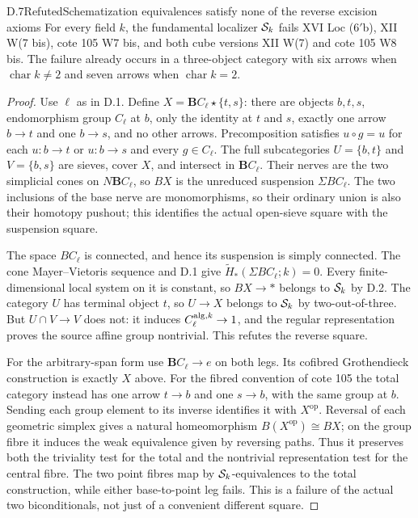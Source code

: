 \begin{claim}{D.7}{Refuted}{Schematization equivalences satisfy none of the reverse excision axioms}
\label{D7}
For every field $k$, the fundamental localizer $\mathcal S_k$ fails XVI
Loc (6$'$b), XII W(7 bis), cote 105 W7 bis, and both cube versions
XII W(7) and cote 105 W8 bis. The failure already occurs in a
three-object category with six arrows when $\operatorname{char}k\ne2$
and seven arrows when $\operatorname{char}k=2$.
\end{claim}
\begin{proof}
Use $\ell$ as in D.1. Define $X=\mathbf B C_\ell\star\{t,s\}$:
there are objects $b,t,s$, endomorphism group $C_\ell$ at $b$,
only the identity at $t$ and $s$, exactly one arrow $b\to t$ and
one $b\to s$, and no other arrows. Precomposition satisfies $u\circ g=u$ for each $u:b\to t$ or $u:b\to s$ and every $g\in C_\ell$.
The full subcategories $U=\{b,t\}$ and $V=\{b,s\}$ are sieves,
cover $X$, and intersect in $\mathbf B C_\ell$.
Their nerves are the two simplicial cones on $N\mathbf B C_\ell$,
so $BX$ is the unreduced suspension $\Sigma BC_\ell$.
The two inclusions of the base nerve are monomorphisms, so their
ordinary union is also their homotopy pushout; this identifies the
actual open-sieve square with the suspension square.

The space $BC_\ell$ is connected, and hence its suspension is simply
connected. The cone Mayer--Vietoris sequence and D.1 give
$\widetilde H_*(\Sigma BC_\ell;k)=0$. Every finite-dimensional local
system on it is constant, so $BX\to *$ belongs to $\mathcal S_k$ by D.2.
The category $U$ has terminal object $t$, so $U\to X$ belongs to
$\mathcal S_k$ by two-out-of-three. But $U\cap V\to V$ does not: it induces
$C_\ell^{\mathrm{alg},k}\to1$, and the regular representation proves the
source affine group nontrivial. This refutes the reverse square.

For the arbitrary-span form use $\mathbf B C_\ell\to e$ on both
legs. Its cofibred Grothendieck construction is exactly $X$ above.
For the fibred convention of cote 105 the total category instead has
one arrow $t\to b$ and one $s\to b$, with the same group at $b$.
Sending each group element to its inverse identifies it with $X^{\mathrm{op}}$.
Reversal of each geometric simplex gives a natural homeomorphism
$B(X^{\mathrm{op}})\cong BX$; on the group fibre it induces the
weak equivalence given by reversing paths. Thus it preserves both the
triviality test for the total and the nontrivial representation test
for the central fibre.
The two point fibres map by $\mathcal S_k$-equivalences to the total
construction, while either base-to-point leg fails. This is a
failure of the actual two biconditionals, not just of a convenient
different square.


\end{proof}
